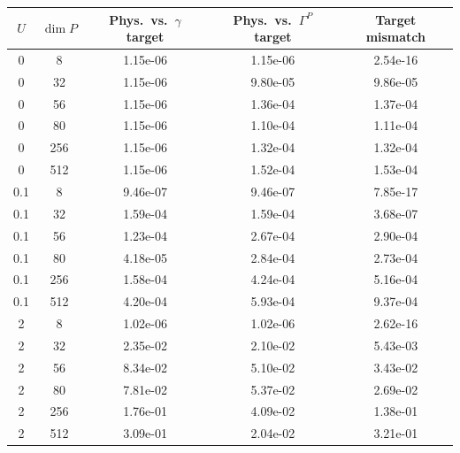 \begin{tabular}{ccccc}
\hline
$U$ & $\dim P$ & Phys.\ vs.\ $\gamma$ target & Phys.\ vs.\ $\Gamma^P$ target & Target mismatch \\
\hline
0 & 8 & 1.15e-06 & 1.15e-06 & 2.54e-16 \\
0 & 32 & 1.15e-06 & 9.80e-05 & 9.86e-05 \\
0 & 56 & 1.15e-06 & 1.36e-04 & 1.37e-04 \\
0 & 80 & 1.15e-06 & 1.10e-04 & 1.11e-04 \\
0 & 256 & 1.15e-06 & 1.32e-04 & 1.32e-04 \\
0 & 512 & 1.15e-06 & 1.52e-04 & 1.53e-04 \\
\hline
0.1 & 8 & 9.46e-07 & 9.46e-07 & 7.85e-17 \\
0.1 & 32 & 1.59e-04 & 1.59e-04 & 3.68e-07 \\
0.1 & 56 & 1.23e-04 & 2.67e-04 & 2.90e-04 \\
0.1 & 80 & 4.18e-05 & 2.84e-04 & 2.73e-04 \\
0.1 & 256 & 1.58e-04 & 4.24e-04 & 5.16e-04 \\
0.1 & 512 & 4.20e-04 & 5.93e-04 & 9.37e-04 \\
\hline
2 & 8 & 1.02e-06 & 1.02e-06 & 2.62e-16 \\
2 & 32 & 2.35e-02 & 2.10e-02 & 5.43e-03 \\
2 & 56 & 8.34e-02 & 5.10e-02 & 3.43e-02 \\
2 & 80 & 7.81e-02 & 5.37e-02 & 2.69e-02 \\
2 & 256 & 1.76e-01 & 4.09e-02 & 1.38e-01 \\
2 & 512 & 3.09e-01 & 2.04e-02 & 3.21e-01 \\
\hline
\end{tabular}
